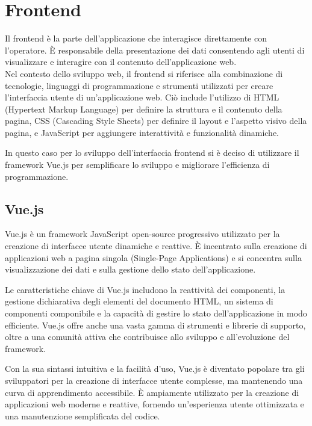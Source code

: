 \section{Frontend}
Il frontend è la parte dell’applicazione che interagisce direttamente con 
l’operatore. È responsabile della presentazione dei dati consentendo agli 
utenti di visualizzare e interagire con il contenuto dell'applicazione web.\\

Nel contesto dello sviluppo web, il frontend si riferisce alla combinazione 
di tecnologie, linguaggi di programmazione e strumenti utilizzati per creare 
l'interfaccia utente di un'applicazione web. Ciò include l'utilizzo di HTML 
(Hypertext Markup Language) per definire la struttura e il contenuto della 
pagina, CSS (Cascading Style Sheets) per definire il layout e l'aspetto 
visivo della pagina, e JavaScript per aggiungere interattività e funzionalità 
dinamiche.

In questo caso per lo sviluppo dell’interfaccia frontend si è deciso di 
utilizzare il framework Vue.js per semplificare lo sviluppo e migliorare 
l'efficienza di programmazione.

\subsection{Vue.js}
Vue.js è un framework JavaScript open-source progressivo utilizzato per la creazione di 
interfacce utente dinamiche e reattive. È incentrato sulla creazione di 
applicazioni web a pagina singola (Single-Page Applications) e si concentra 
sulla visualizzazione dei dati e sulla gestione dello stato dell'applicazione.

Le caratteristiche chiave di Vue.js includono la reattività dei componenti, 
la gestione dichiarativa degli elementi del documento HTML, un sistema di 
componenti componibile e la capacità di gestire lo stato dell'applicazione in 
modo efficiente. Vue.js offre anche una vasta gamma di strumenti e librerie di 
supporto, oltre a una comunità attiva che contribuisce allo sviluppo e 
all'evoluzione del framework.

Con la sua sintassi intuitiva e la facilità d'uso, Vue.js è diventato popolare 
tra gli sviluppatori per la creazione di interfacce utente complesse, ma 
mantenendo una curva di apprendimento accessibile. È ampiamente utilizzato per 
la creazione di applicazioni web moderne e reattive, fornendo un'esperienza 
utente ottimizzata e una manutenzione semplificata del codice. 
~\cite{wiki:vuejs}\\


